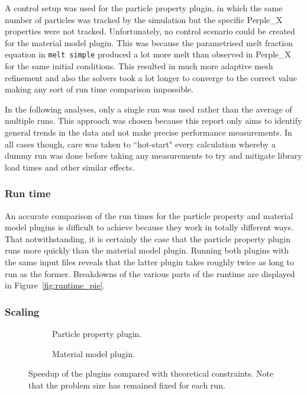 A control setup was used for the particle property plugin, in which the same number of particles was tracked by the simulation but the specific Perple\_X properties were not tracked.
Unfortunately, no control scenario could be created for the material model plugin.
This was because the parametrised melt fraction equation in \texttt{melt simple} produced a lot more melt than observed in Perple\_X for the same initial conditions.
This resulted in much more adaptive mesh refinement and also the solvers took a lot longer to converge to the correct value making any sort of run time comparison impossible.

\vspace{5mm}

In the following analyses, only a single run was used rather than the average of multiple runs.
This approach was chosen because this report only aims to identify general trends in the data and not make precise performance measurements.
In all cases though, care was taken to ``hot-start" every calculation whereby a dummy run was done before taking any measurements to try and mitigate library load times and other similar effects.

\subsubsection{Run time}

An accurate comparison of the run times for the particle property and material model plugins is difficult to achieve because they work in totally different ways.
That notwithstanding, it is certainly the case that the particle property plugin runs more quickly than the material model plugin.
Running both plugins with the same input files reveals that the latter plugin takes roughly twice as long to run as the former.
Breakdowns of the various parts of the runtime are displayed in Figure~\ref{fig:runtime_pie}.

\subsubsection{Scaling}

\begin{figure}
    \centering
    \begin{subfigure}{0.49\textwidth}
        \centering
        
        \caption{Particle property plugin.}
        \label{fig:scaling_particle_property}
    \end{subfigure}
    \hfill
    \begin{subfigure}{0.49\textwidth}
        \centering
        
        \caption{Material model plugin.}
        \label{fig:scaling_material_model}
    \end{subfigure}
    \caption{
        Speedup of the plugins compared with theoretical constraints. 
        Note that the problem size has remained fixed for each run.
    }
    \label{fig:scaling}
\end{figure}

